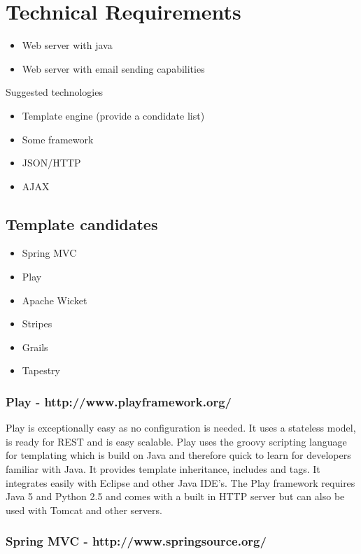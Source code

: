 \documentclass{acm_proc_article-sp}
\begin{document}
\section{Technical Requirements}
\begin{itemize}
  \item Web server with java
  \item Web server with email sending capabilities
\end{itemize}
Suggested technologies
\begin{itemize}
  \item Template engine (provide a condidate list)
  \item Some framework
  \item JSON/HTTP
  \item AJAX
\end{itemize}
 
\subsection{Template candidates}
\begin{itemize}
 \item Spring MVC
 \item Play
 \item Apache Wicket
 \item Stripes
 \item Grails
 \item Tapestry
\end{itemize}

\subsubsection*{Play - http://www.playframework.org/}

Play is exceptionally easy as no configuration is needed. It uses a stateless model, is ready for REST and is easy scalable. Play uses the groovy scripting language for templating which is build on Java and therefore quick to learn for developers familiar with Java. It provides template inheritance, includes and tags. It integrates easily with Eclipse and other Java IDE's. The Play framework requires Java 5 and Python 2.5 and comes with a built in HTTP server but can also be used with Tomcat and other servers.

\subsubsection*{Spring MVC - http://www.springsource.org/}
\end{document}
